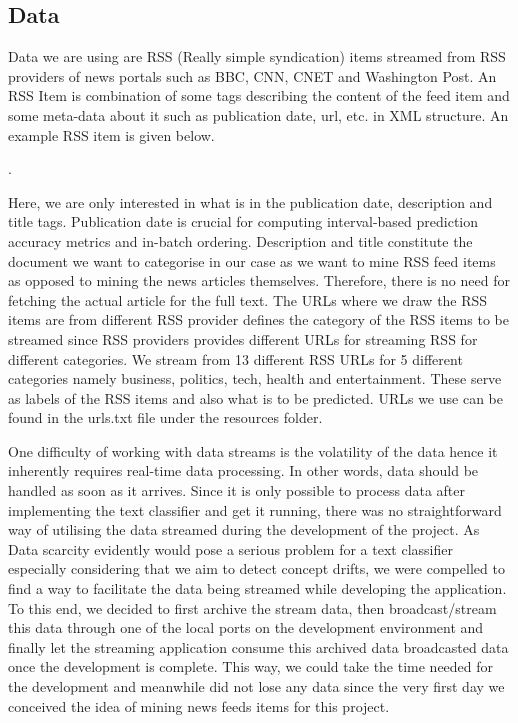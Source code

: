 \documentclass{article} %
\begin{document}
\subsection{Data}
Data we are using are RSS (Really simple syndication) items streamed from RSS providers of news portals such as BBC, CNN, CNET and Washington Post. An RSS Item is combination of some tags describing the content of the feed item and some meta-data about it such as publication date, url, etc. in XML structure. An example RSS item is given below.

    .

Here, we are only interested in what is in the publication date, description and title tags. Publication date is crucial for computing interval-based prediction accuracy metrics and in-batch ordering. Description and title constitute the document we want to categorise in our case as we want to mine RSS feed items as opposed to mining the news articles themselves. Therefore, there is no need for fetching the actual article for the full text. The URLs where we draw the RSS items are from different RSS provider defines the category of the RSS items to be streamed since RSS providers provides different URLs for streaming RSS for different categories. We stream from 13 different RSS URLs for 5 different categories namely business, politics, tech, health and entertainment. These serve as labels of the RSS items and also what is to be predicted. URLs we use can be found in the urls.txt file under the resources folder.

One difficulty of working with data streams is the volatility of the data hence it inherently requires real-time data processing. In other words,  data should be handled as soon as it arrives. Since it is only possible to process data after implementing the text classifier and get it running, there was no straightforward way of utilising the data streamed during the development of the project. As Data scarcity evidently would pose a serious problem for a text classifier especially considering that we aim to detect concept drifts, we were compelled to find a way to facilitate the data being streamed while developing the application. To this end, we decided to first archive the stream data, then broadcast/stream this data through one of the local ports on the development environment and finally let the streaming application consume this archived data broadcasted data once the development is complete. This way, we could take the time needed for the development and meanwhile did not lose any data since the very first day we conceived the idea of mining news feeds items for this project.
\end{document}
